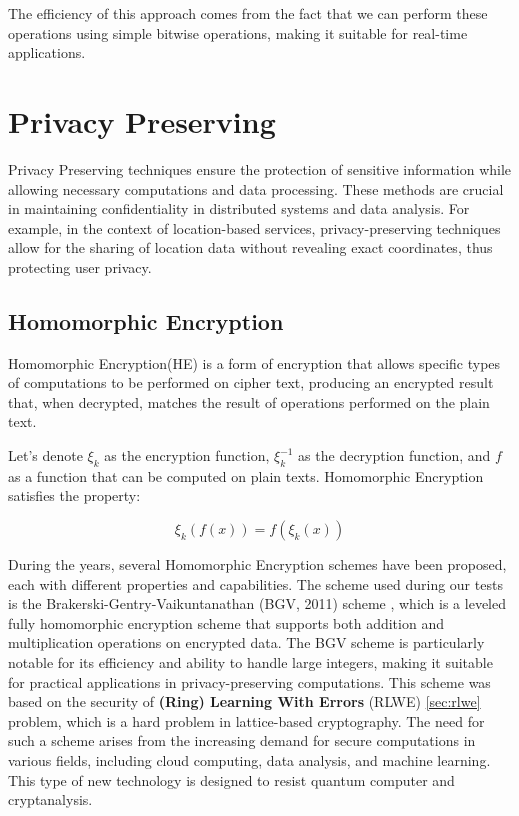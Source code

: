 The efficiency of this approach comes from the fact that we can perform these operations using simple bitwise operations, making it suitable for real-time applications.


\section{Privacy Preserving}
Privacy Preserving techniques ensure the protection of sensitive information while allowing necessary computations and data processing. These methods are crucial in maintaining confidentiality in distributed systems and data analysis. For example, in the context of location-based services, privacy-preserving techniques allow for the sharing of location data without revealing exact coordinates, thus protecting user privacy.

\subsection{Homomorphic Encryption}
Homomorphic Encryption(HE) is a form of encryption that allows specific types of computations to be performed on cipher text, producing an encrypted result that, when decrypted, matches the result of operations performed on the plain text.

Let's denote \( \xi_k \) as the encryption function, \( \xi_k^{-1} \) as the decryption function, and \( f \) as a function that can be computed on plain texts. Homomorphic Encryption satisfies the property:

\[
    \xi_k(f(x)) = f(\xi_k(x))
\]

During the years, several Homomorphic Encryption schemes have been proposed, each with different properties and capabilities. The scheme used during our tests is the Brakerski-Gentry-Vaikuntanathan (BGV, 2011) scheme \cite{Brakerski2012-wj}, which is a leveled fully homomorphic encryption scheme that supports both addition and multiplication operations on encrypted data. The BGV scheme is particularly notable for its efficiency and ability to handle large integers, making it suitable for practical applications in privacy-preserving computations.
This scheme was based on the security of \textbf{(Ring) Learning With Errors} (RLWE) \cref{sec:rlwe} problem, which is a hard problem in lattice-based cryptography. The need for such a scheme arises from the increasing demand for secure computations in various fields, including cloud computing, data analysis, and machine learning. This type of new technology is designed to resist quantum computer and cryptanalysis. 

